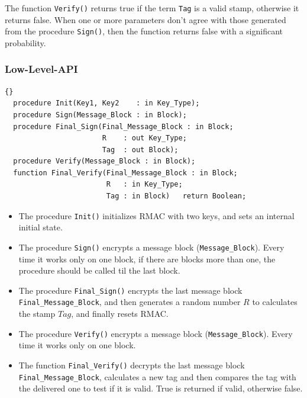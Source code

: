 The function \texttt{Verify()} returns true if the term \texttt{Tag}
is a valid stamp, otherwise it returns false. When one or more
parameters don't agree with those generated from the procedure
\texttt{Sign()}, then the function returns false with a significant
probability.


\subsubsection*{Low-Level-API}
\begin{lstlisting}{}
  procedure Init(Key1, Key2    : in Key_Type);
  procedure Sign(Message_Block : in Block);
  procedure Final_Sign(Final_Message_Block : in Block;
                       R    : out Key_Type;
                       Tag  : out Block);
  procedure Verify(Message_Block : in Block);
  function Final_Verify(Final_Message_Block : in Block;
                        R   : in Key_Type;
                        Tag : in Block)   return Boolean;
\end{lstlisting}
\begin{itemize}
\item The procedure \texttt{Init()} initializes RMAC with two keys,
  and sets an internal initial state.
\item The procedure \texttt{Sign()} encrypts a message block
  (\texttt{Message\_Block}). Every time it works only on one block, if
  there are blocks more than one, the procedure should be called til
  the last block.
\item The procedure \texttt{Final\_Sign()} encrypts the last message
  block \texttt{Final\_Message\_Block}, and then generates a random
  number $R$ to calculates the stamp $Tag$, and finally resets RMAC.
\item The procedure \texttt{Verify()} encrypts a message block
  (\texttt{Message\_Block}). Every time it works only on one block.
\item The function \texttt{Final\_Verify()} decrypts the last message
  block \texttt{Final\_Message\_Block}, calculates a new tag and then
  compares the tag with the delivered one to test if it is valid. True
  is returned if valid, otherwise false.
\end{itemize}

